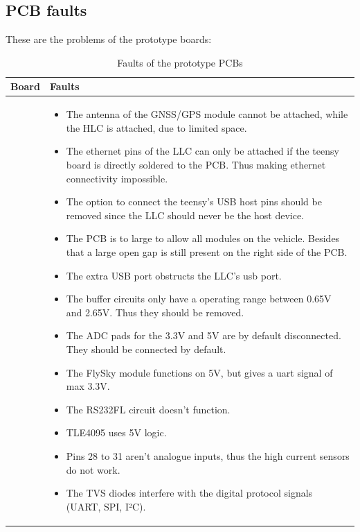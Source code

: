 \documentclass[ti,oneside,10pt]{uantwerpenreport}
\begin{document}
\subsection{PCB faults}
These are the problems of the prototype boards:
\begin{table}[h!]
    \centering
    \caption{Faults of the prototype PCBs}
    \centering
    \begin{tabular}{p{} p{}}
        \toprule
            \textbf{Board} & \textbf{Faults} \\
        \midrule
            \raisebox{-3.33mm}{Logic:} & 
            \begin{itemize}
                \item The antenna of the GNSS/GPS module cannot be attached, while the HLC is attached, due to limited space.
                \item The ethernet pins of the LLC can only be attached if the teensy board is directly soldered to the PCB.
                      Thus making ethernet connectivity impossible.
                \item The option to connect the teensy's USB host pins should be removed since the LLC should never be the host device.
                \item The PCB is to large to allow all modules on the vehicle.
                      Besides that a large open gap is still present on the right side of the PCB.
                \item The extra USB port obstructs the LLC's usb port.
                \item The buffer circuits only have a operating range between 0.65V and 2.65V.
                      Thus they should be removed.
                \item The ADC pads for the 3.3V and 5V are by default disconnected.
                      They should be connected by default.
                \item The FlySky module functions on 5V, but gives a uart signal of max 3.3V.
                \item The RS232FL circuit doesn't function.
                \item TLE4095 uses 5V logic.
                \item Pins 28 to 31 aren't analogue inputs, thus the high current sensors do not work.
                \item The TVS diodes interfere with the digital protocol signals (UART, SPI, I²C).
            \end{itemize} \\

\end{tabular}
\end{table}
\end{document}
